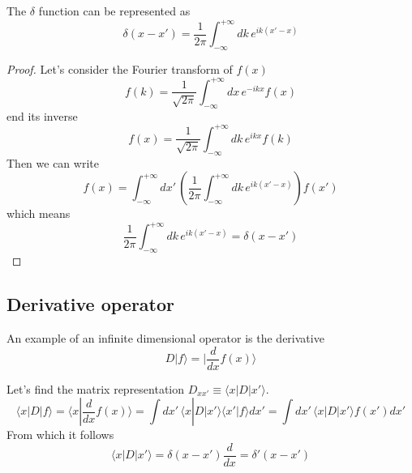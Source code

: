 \documentclass[11pt,fleqn]{book} %
\newcommand{\bra}[1]{\langle #1|}
\newcommand{\ket}[1]{| #1\rangle}
\newcommand{\scalar}[2]{\langle #1| #2\rangle}
\begin{document}
\begin{theorem}
    The $\delta$ function can be represented as
    \begin{equation*}
        \delta(x-x') = \frac{1}{2\pi}\int_ {-\infty}^{+\infty}\!dk\,e^{ik(x'-x)}
    \end{equation*}
\end{theorem}
\begin{proof}
    Let's consider the Fourier transform of $f(x)$
    \begin{equation*}
        f(k) = \frac{1}{\sqrt{2\pi}}\int_ {-\infty}^{+\infty}\!dx\,e^{-ikx}f(x)
    \end{equation*}
    end its inverse
    \begin{equation*}
        f(x) = \frac{1}{\sqrt{2\pi}}\int_ {-\infty}^{+\infty}\!dk\,e^{ikx}f(k)
    \end{equation*}
    Then we can write
    \begin{equation*}
        f(x) = \int_ {-\infty}^{+\infty}\!dx'\,\left(\frac{1}{2\pi}\int_ {-\infty}^{+\infty}\!dk\,e^{ik(x'-x)}\right)f(x')
    \end{equation*}
    which means
    \begin{equation*}
        \frac{1}{2\pi}\int_ {-\infty}^{+\infty}\!dk\,e^{ik(x'-x)} = \delta(x-x')
    \end{equation*}
\end{proof}


\subsection{Derivative operator}
An example of an infinite dimensional operator is the derivative
\begin{equation*}
    D\ket{f} = \ket{\frac{d}{dx}f(x)}
\end{equation*}

Let's find the matrix representation $D_{xx'} \equiv \bra{x}D\ket{x'}$.
\begin{equation*}
     \bra{x}D\ket{f} = \scalar{x}{\frac{d}{dx}f(x)} = 
     \int\!\!dx'\,\bra{x}D\ket{x'}\scalar{x'}{f}dx' = 
     \int\!\!dx'\,\bra{x}D\ket{x'}f(x')dx'
\end{equation*}
From which it follows
\begin{equation}
    \label{eq:hermiticity_D}
    \bra{x}D\ket{x'} = \delta(x-x')\frac{d}{dx} = \delta'(x-x')
\end{equation}
\end{document}

